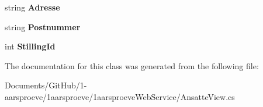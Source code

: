 \begin{DoxyCompactItemize}
\item 
\hypertarget{class__1aarsproeve_web_service_1_1_ansatte_view_ad181f1e27f096319bf2f107a832bcae4}{}string {\bfseries Adresse}\label{class__1aarsproeve_web_service_1_1_ansatte_view_ad181f1e27f096319bf2f107a832bcae4}

\item 
\hypertarget{class__1aarsproeve_web_service_1_1_ansatte_view_a4b8033532cdc6d411a2ed3afc852f22f}{}string {\bfseries Postnummer}\label{class__1aarsproeve_web_service_1_1_ansatte_view_a4b8033532cdc6d411a2ed3afc852f22f}

\item 
\hypertarget{class__1aarsproeve_web_service_1_1_ansatte_view_a20efc44aba45f87d58986746a6c26d5c}{}int {\bfseries Stilling\+Id}\label{class__1aarsproeve_web_service_1_1_ansatte_view_a20efc44aba45f87d58986746a6c26d5c}

\end{DoxyCompactItemize}


The documentation for this class was generated from the following file\+:\begin{DoxyCompactItemize}
\item 
Documents/\+Git\+Hub/1-\/aarsproeve/1aarsproeve/1aarsproeve\+Web\+Service/Ansatte\+View.\+cs\end{DoxyCompactItemize}
